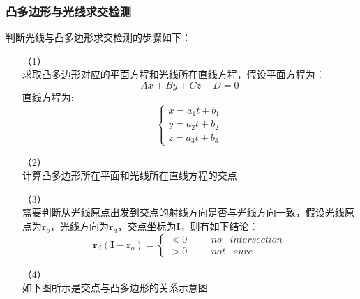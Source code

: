\documentclass[10pt]{article}
\begin{document}
\subsubsection{凸多边形与光线求交检测}
判断光线与凸多边形求交检测的步骤如下：
\begin{itemize}
\item[（1）]{} \mbox{} \\
求取凸多边形对应的平面方程和光线所在直线方程，假设平面方程为：
$$Ax+By+Cz+D=0$$
直线方程为:
$$
\left\{
\begin{array}{rl}
x=a_1t+b_1\\
y=a_2t+b_2\\
z=a_3t+b_3
\end{array}
\right.
$$
\item[（2）]{} \mbox{} \\
计算凸多边形所在平面和光线所在直线方程的交点
\item[（3）]{} \mbox{} \\
需要判断从光线原点出发到交点的射线方向是否与光线方向一致，假设光线原点为$\bm{r}_o$，光线方向为$\bm{r}_d$，交点坐标为$\bm{I}$，则有如下结论：
$$
\bm{r}_d(\bm{I}-\bm{r}_o)=
\left\{
\begin{array}{rl}
<0 & \hspace{20pt} no \hspace{10pt} intersection \\
>0 & \hspace{20pt} not \hspace{10pt} sure
\end{array}
\right.
$$
\item[（4）]{}  \mbox{} \\
如下图所示是交点与凸多边形的关系示意图
\begin{figure}[H]
\begin{center}

\end{center}
\end{figure}
\end{itemize}
\end{document}
